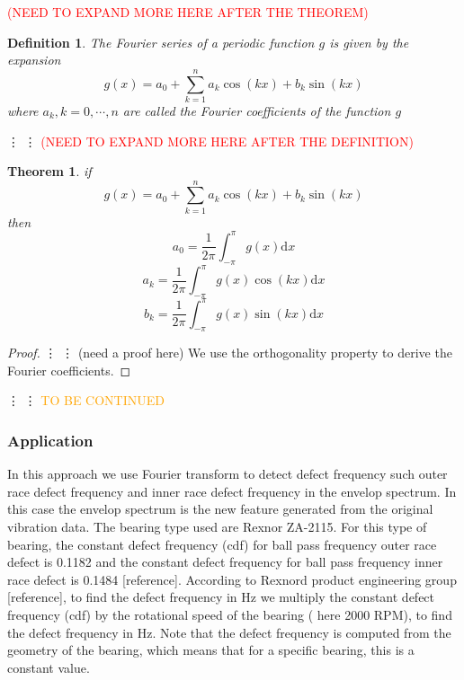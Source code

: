 \documentclass[11pt, oneside]{article}   	%
\newtheorem{theorem}{Theorem}
\newtheorem{definition}{Definition}
\newtheorem{proof}{Proof}
\begin{document}
\textcolor{red}{(NEED TO EXPAND MORE HERE AFTER THE THEOREM)}
\begin{definition}
The Fourier series of a periodic function $g$ is given by the expansion 
\begin{equation}
g(x) = a_{0} + \sum_{k=1}^{n}a_{k}\cos(kx)+b_{k}\sin(kx)
\end{equation}
where $a_{k}, k=0,\cdots, n$ are called the Fourier coefficients of the function $g$
\end{definition}
\vdots
\vdots
\textcolor{red}{(NEED TO EXPAND MORE HERE AFTER THE DEFINITION)}
\begin{theorem}
if 
\begin{equation}
g(x) = a_{0} + \sum_{k=1}^{n}a_{k}\cos(kx)+b_{k}\sin(kx)
\end{equation}
then 
\begin{equation}
a_{0} = \frac{1}{2\pi}\int_{-\pi}^{\pi}g(x)\mathrm{d}x
\end{equation}
\begin{equation}
a_{k} = \frac{1}{2\pi}\int_{-\pi}^{\pi}g(x)\cos(kx)\mathrm{d}x
\end{equation}
\begin{equation}
b_{k} = \frac{1}{2\pi}\int_{-\pi}^{\pi}g(x)\sin(kx)\mathrm{d}x
\end{equation}
\end{theorem}

\begin{proof}
\vdots
\vdots
(need a proof here) We use the orthogonality property to derive the Fourier coefficients.
\end{proof}

\vdots
\vdots
\textcolor{orange}{TO BE CONTINUED}











\subsubsection{Application}
In this approach we use Fourier transform to detect defect frequency such outer race defect frequency and inner race defect frequency in the envelop spectrum. In this case the envelop spectrum is the new feature generated from the original vibration data. The bearing type used are Rexnor ZA-2115. For this type of bearing, the constant defect frequency (cdf) for ball pass frequency outer race defect is 0.1182 and the constant defect frequency for ball pass frequency inner race defect is 0.1484 [reference]. According to Rexnord product engineering group [reference], to find the defect frequency in Hz we multiply the constant defect frequency (cdf) by the rotational speed of the bearing ( here 2000 RPM), to find the defect frequency in Hz. Note that the defect frequency is computed from the geometry of the bearing, which means that for a specific bearing, this is a constant value. 
\end{document}
